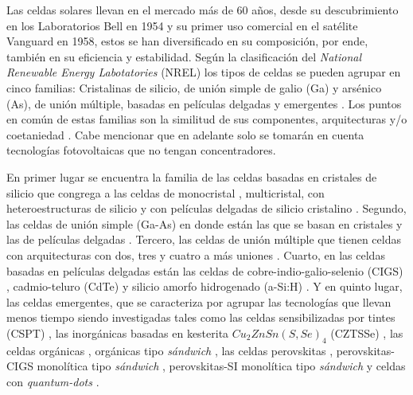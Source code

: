 Las celdas solares llevan en el mercado más de 60 años, desde su descubrimiento en los  Laboratorios Bell en 1954 \cite{green2009path} y su primer uso comercial en el satélite Vanguard \cite{singh2013solar} en 1958, estos se han diversificado en su composición, por ende, también en su eficiencia y estabilidad. Según la clasificación del \textit{National Renewable Energy Labotatories} (NREL) los tipos de celdas se pueden agrupar en cinco familias: Cristalinas de silicio, de unión simple de galio (Ga) y arsénico (As), de unión múltiple, basadas en películas delgadas y emergentes \cite{nrel}. Los puntos en común de estas familias son la similitud de sus componentes, arquitecturas y/o coetaniedad \cite{blakers2013}. Cabe mencionar que en adelante solo se tomarán en cuenta tecnologías fotovoltaicas que no tengan concentradores.


En primer lugar se encuentra la familia de las celdas basadas en cristales de silicio que congrega a las celdas de monocristal \cite{gul2016}, multicristal\cite{moller2005multicrystalline}, con heteroestructuras de silicio \cite{sark2012introduction} y con películas delgadas de silicio cristalino \cite{brendel2011thin}. Segundo, las celdas de unión simple (Ga-As) en donde están las que se basan en cristales y las de películas delgadas \cite{konagai1978high}. Tercero, las celdas de unión múltiple que tienen celdas con arquitecturas con dos, tres y cuatro a más uniones \cite{dimroth2007high, philipps2018high}. Cuarto, en las celdas basadas en películas delgadas están las celdas de cobre-indio-galio-selenio (CIGS) \cite{wada2001high}, cadmio-teluro (CdTe) \cite{ferekides2004cdte} y silicio amorfo hidrogenado (a-Si:H) \cite{krvc2003analysis}. Y en quinto lugar, las celdas emergentes, que se caracteriza por agrupar las tecnologías que llevan menos tiempo siendo investigadas tales como las celdas sensibilizadas por tintes (CSPT) \cite{sharma2018dye}, las inorgánicas basadas en kesterita $Cu_2ZnSn(S,Se)_4$ (CZTSSe) \cite{suryawanshi2013czts}, las celdas orgánicas \cite{hoppe2004organic}, orgánicas tipo \textit{sándwich} \cite{ameri2009organic}, las celdas perovskitas \cite{jung2015perovskite}, perovskitas-CIGS monolítica tipo \textit{sándwich} \cite{li2020perovskite}, perovskitas-SI monolítica tipo \textit{sándwich} \cite{li2020perovskite} y celdas con \textit{quantum-dots} \cite{kim2022conformal}. 

